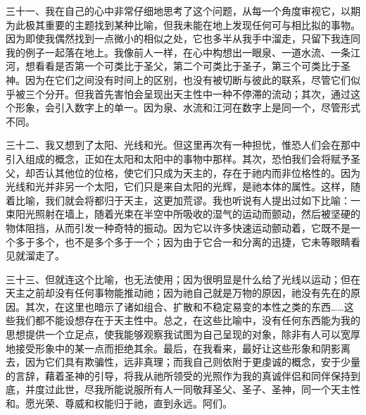 三十一、我在自己的心中非常仔细地思考了这个问题，从每一个角度审视它，以期为此极其重要的主题找到某种比喻，但我未能在地上发现任何可与相比拟的事物。因为即使我偶然找到一点微小的相似之处，它也多半从我手中溜走，只留下我连同我的例子一起落在地上。我像前人一样，在心中构想出一眼泉、一道水流、一条江河，想看看是否第一个可类比于圣父，第二个可类比于圣子，第三个可类比于圣神。因为在它们之间没有时间上的区别，也没有被切断与彼此的联系，尽管它们似乎被三个分开。但我首先害怕会呈现出天主性中一种不停滞的流动；其次，通过这个形象，会引入数字上的单一。因为泉、水流和江河在数字上是同一个，尽管形式不同。\par

三十二、我又想到了太阳、光线和光。但这里再次有一种担忧，惟恐人们会在那中引入组成的概念，正如在太阳和太阳中的事物中那样。其次，恐怕我们会将赋予圣父，却否认其他位的位格，使它们只成为天主的，存在于祂内而非位格性的。因为光线和光并非另一个太阳，它们只是来自太阳的光辉，是祂本体的属性。这样，随着比喻，我们就会将都归于天主，这更加荒谬。我也听说有人提出过如下比喻：一束阳光照射在墙上，随着光束在半空中所吸收的湿气的运动而颤动，然后被坚硬的物体阻挡，从而引发一种奇特的振动。因为它以许多快速运动颤动着，它既不是一个多于多个，也不是多个多于一个；因为由于它合一和分离的迅捷，它未等眼睛看见就溜走了。\par

三十三、但就连这个比喻，也无法使用；因为很明显是什么给了光线以运动；但在天主之前却没有任何事物能推动祂；因为祂自己就是万物的原因，祂没有先在的原因。其次，在这里也暗示了诸如组合、扩散和不稳定易变的本性之类的东西……这些我们都不能设想存在于天主性中。总之，在这些比喻中，没有任何东西能为我的思想提供一个立足点，使我能够观察我试图为自己呈现的对象，除非有人可以宽厚地接受形象中的某一点而拒绝其余。最后，在我看来，最好让这些形象和阴影离去，因为它们具有欺骗性，远非真理；而我自己则依附于更虔诚的概念，安于少量的言辞，藉着圣神的引导，将我从祂所领受的光照作为我的真诚伴侣和同伴保持到底，并度过此世，尽我所能说服所有人一同敬拜圣父、圣子、圣神，同一个天主性和。愿光荣、尊威和权能归于祂，直到永远。阿们。\par


